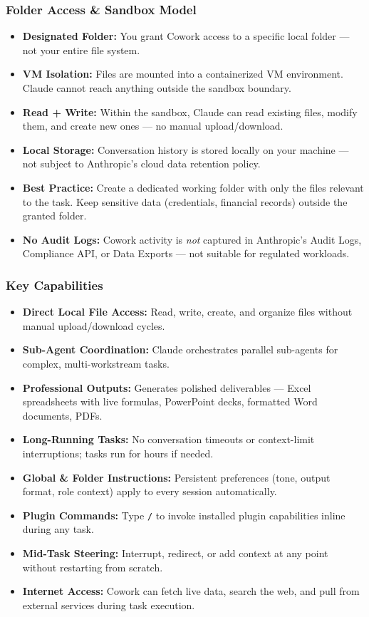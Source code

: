 \begin{frame}[fragile]\frametitle{Folder Access \& Sandbox Model}
  \begin{itemize}
    \item \textbf{Designated Folder:} You grant Cowork access to a specific local folder — not your entire file system.
    \item \textbf{VM Isolation:} Files are mounted into a containerized VM environment. Claude cannot reach anything outside the sandbox boundary.
    \item \textbf{Read + Write:} Within the sandbox, Claude can read existing files, modify them, and create new ones — no manual upload/download.
    \item \textbf{Local Storage:} Conversation history is stored locally on your machine — not subject to Anthropic's cloud data retention policy.
    \item \textbf{Best Practice:} Create a dedicated working folder with only the files relevant to the task. Keep sensitive data (credentials, financial records) outside the granted folder.
    \item \textbf{No Audit Logs:} Cowork activity is \textit{not} captured in Anthropic's Audit Logs, Compliance API, or Data Exports — not suitable for regulated workloads.
  \end{itemize}
\end{frame}

\begin{frame}[fragile]\frametitle{Key Capabilities}
  \begin{itemize}
    \item \textbf{Direct Local File Access:} Read, write, create, and organize files without manual upload/download cycles.
    \item \textbf{Sub-Agent Coordination:} Claude orchestrates parallel sub-agents for complex, multi-workstream tasks.
    \item \textbf{Professional Outputs:} Generates polished deliverables — Excel spreadsheets with live formulas, PowerPoint decks, formatted Word documents, PDFs.
    \item \textbf{Long-Running Tasks:} No conversation timeouts or context-limit interruptions; tasks run for hours if needed.
    \item \textbf{Global \& Folder Instructions:} Persistent preferences (tone, output format, role context) apply to every session automatically.
    \item \textbf{Plugin Commands:} Type \texttt{/} to invoke installed plugin capabilities inline during any task.
    \item \textbf{Mid-Task Steering:} Interrupt, redirect, or add context at any point without restarting from scratch.
    \item \textbf{Internet Access:} Cowork can fetch live data, search the web, and pull from external services during task execution.
  \end{itemize}
\end{frame}

